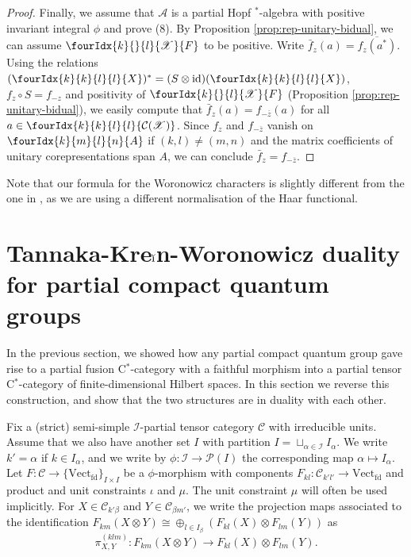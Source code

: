 \documentclass[10pt]{article}
\DeclareMathOperator{\fin}{\mathrm{fd}}
\DeclareMathOperator{\id}{id}
\newcommand{\CatC}{\mathcal{C}}
\newcommand{\CatCC}{\mathscr{C}}
\newcommand{\Vect}{\mathrm{Vect}}
\newcommand{\Gr}[5]{\fourIdx{#2}{#4}{#3}{#5}{#1}}%
\theoremstyle{definition}
\numberwithin{equation}{section}
\begin{document}
\begin{proof}
     Finally, we assume that $\mathscr{A}$ is a partial Hopf
     $^*$-algebra with positive invariant integral $\phi$ and prove
     (8).  By Proposition \ref{prop:rep-unitary-bidual}, we can assume
     $\Gr{F}{k}{l}{}{\mathscr{X}}$ to be positive.  Write
     $\bar{f}_z(a) = \overline{f_z(a^*)}$. Using the relations $
     (\Gr{X}{k}{l}{k}{l})^{*}=(S \otimes \id)(\Gr{X}{k}{l}{k}{l})$,
     $f_{z} \circ S=f_{-z}$  and
     positivity of $\Gr{F}{k}{l}{}{\mathscr{X}}$ (Proposition
     \ref{prop:rep-unitary-bidual}), we easily compute that $\bar{f}_z(a) = f_{-\overline{z}}(a)$ for all $a\in
\Gr{\mathcal{C}(\mathscr{X})}{k}{l}{k}{l}$. Since $f_{z}$ and
$f_{-\overline{z}}$ vanish on $\Gr{A}{k}{l}{m}{n}$ if $(k,l)\neq
(m,n)$ and the matrix coefficients of unitary 
corepresentations span $A$, we can conclude $\bar{f}_{z}=f_{-\overline{z}}$.
\end{proof}

Note that our formula for the Woronowicz characters is slightly different from the one in \cite{Hay1}, as we are using a different normalisation of the Haar functional.


\section{Tannaka-Kre$\breve{\textrm{\i}}$n-Woronowicz duality for partial compact quantum groups}

In the previous section, we showed how any partial compact quantum group gave rise to a partial fusion C$^*$-category with a faithful morphism into a partial tensor C$^*$-category of finite-dimensional Hilbert spaces. In this section we reverse this construction, and show that the two structures are in duality with each other. 

Fix a (strict) semi-simple $\mathscr{I}$-partial tensor category $\CatCC$ with irreducible units. Assume that we also have another set $I$ with partition $I = \sqcup_{\alpha\in \mathscr{I}} I_{\alpha}$. We write $k' = \alpha$ if $k\in I_{\alpha}$, and we write by $\phi: \mathscr{I}\rightarrow \mathscr{P}(I)$ the corresponding map $\alpha \mapsto I_{\alpha}$.  Let $F: \CatCC\rightarrow \{\Vect_{\fin}\}_{I\times I}$ be a $\phi$-morphism with components $F_{kl}:\CatCC_{k'l'}\rightarrow \Vect_{\fin}$ and product and unit constraints $\iota$ and $\mu$. The unit constraint $\mu$ will often be used implicitly. For $X\in \CatC_{k'\beta}$ and $Y\in \CatC_{\beta m'}$, we write the projection maps associated to the identification $F_{km}(X\otimes Y)\cong \oplus_{l\in I_\beta} \left(F_{kl}(X)\otimes F_{lm}(Y)\right)$ as \[\pi^{(klm)}_{X,Y}:F_{km}(X\otimes Y) \rightarrow F_{kl}(X)\otimes F_{lm}(Y).\]
\end{document}

